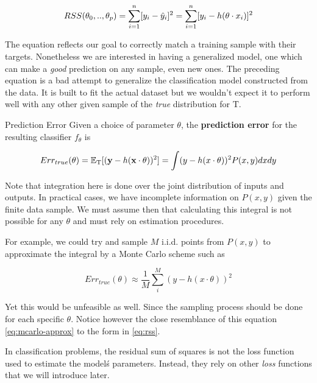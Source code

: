 \begin{equation} \label{eq:rss}
RSS(\theta_0,..,\theta_p)  = \sum_{i=1}^n [y_i - \hat{y}_i]^2  \\
=  \sum_{i=1}^n [y_i - h( \theta \cdot x_i)]^2
\end{equation}

The equation reflects our goal to correctly match a training sample with their targets. Nonetheless we are interested in having a generalized model, one which can make a \textit{good} prediction on any sample, even new ones. The preceding equation is a bad attempt to generalize the classification model constructed from the data. It is built to fit the actual dataset but we wouldn't expect it to perform well with any other given sample of the \textit{true} distribution for $\mathrm{T}$.

\begin{definition}{Prediction Error}
Given a choice of parameter $\theta$, the \textbf{prediction error} for the resulting classifier $f_\theta$ is

\begin{equation}
    Err_{true}(\theta)  = \operatorname{\mathbb{E}}_{ \mathrm{T}}[(\textbf{y} - h(\textbf{x} \cdot \theta) )^2] \\
    = \int (y - h(x \cdot \theta) )^2 P(x,y)dxdy
\end{equation}

\end{definition}

Note that integration here is done over the joint distribution of inputs and outputs. In practical cases, we have incomplete information on $P(x,y)$ given the finite data sample.
We must assume then that calculating this integral is not possible for any $\theta$ and must rely on estimation procedures.

For example, we could try and sample $M$ i.i.d. points from $P(x,y)$ to approximate the integral by a Monte Carlo scheme such as

\begin{equation} \label{eq:mcarlo-approx}
    Err_{true}(\theta)  \approx \frac{1}{M} \sum_i^M ( y - h(x \cdot \theta) )^2
\end{equation}

Yet this would be unfeasible as well. Since the sampling process should be done for each specific $\theta$. Notice however the close resemblance of this equation \ref{eq:mcarlo-approx} to the form in \ref{eq:rss}.

In classification problems, the residual sum of squares is not the loss function used to estimate the model\'s parameters. Instead, they rely on other \textit{loss} functions that we will introduce later.

